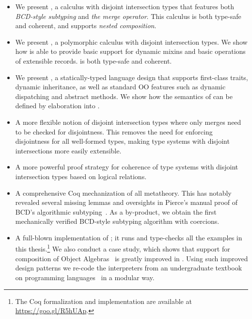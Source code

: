 \begin{itemize}

\item We present \namee, a calculus with disjoint intersection types that
  features both \emph{BCD-style subtyping} and \emph{the merge operator}. This
  calculus is both type-safe and coherent, and supports \emph{nested composition}.

\item We present \fnamee, a polymorphic calculus with disjoint intersection
  types. We show how \fnamee is able to provide basic support for dynamic mixins
  and basic operations of extensible records. \fnamee is both type-safe and
  coherent.

\item We present \sedel, a statically-typed language design that supports
  first-class traits, dynamic inheritance, as well as standard OO features such
  as dynamic dispatching and abstract methods. We show how the semantics of
  \sedel can be defined by elaboration into \fnamee.

\item A more flexible notion of disjoint intersection types where only merges
  need to be checked for disjointness. This removes the need for enforcing
  disjointness for all well-formed types, making type systems with disjoint
  intersections more easily extensible.

\item A more powerful proof strategy for coherence of type systems with disjoint
  intersection types based on logical relations.


\item A comprehensive Coq mechanization of all metatheory. This has notably
  revealed several missing lemmas and oversights in Pierce's manual
  proof of BCD's algorithmic subtyping~\citep{pierce1989decision}. As a
  by-product, we obtain the first mechanically verified BCD-style subtyping
  algorithm with coercions.

\item A full-blown implementation of \sedel; it runs and type-checks all the
  examples in this thesis.\footnote{The Coq formalization and implementation are
    available at \url{https://goo.gl/R5hUAp}.} We also conduct a case study,
  which shows that support for composition of Object
  Algebras~\citep{oliveira2012extensibility} is greatly
  improved in \sedel. Using such improved design patterns we re-code the
  interpreters from an undergraduate textbook on programming
  languages~\citep{poplcook} in a modular way.

\end{itemize}


